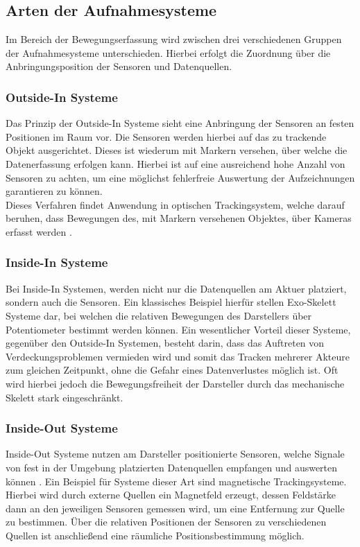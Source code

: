 \subsection{Arten der Aufnahmesysteme}
Im Bereich der Bewegungserfassung wird zwischen drei verschiedenen Gruppen der Aufnahmesysteme unterschieden. Hierbei erfolgt die Zuordnung über die Anbringungsposition der Sensoren und Datenquellen. \cite{P25}
\subsubsection{Outside-In Systeme}
Das Prinzip der Outside-In Systeme sieht eine Anbringung der Sensoren an festen Positionen im Raum vor. Die Sensoren werden hierbei auf das zu trackende Objekt ausgerichtet. Dieses ist wiederum mit Markern versehen, über welche die Datenerfassung erfolgen kann.
Hierbei ist auf eine ausreichend hohe Anzahl von Sensoren zu achten, um eine möglichst fehlerfreie Auswertung der Aufzeichnungen garantieren zu können. \cite{P25}
\\Dieses Verfahren findet Anwendung in optischen Trackingsystem, welche darauf beruhen, dass Bewegungen des, mit Markern versehenen Objektes, über Kameras erfasst werden \cite{optsys2}.
\subsubsection{Inside-In Systeme}
Bei Inside-In Systemen, werden nicht nur die Datenquellen am Aktuer platziert, sondern auch die Sensoren.
Ein klassisches Beispiel hierfür stellen Exo-Skelett Systeme dar, bei welchen die relativen Bewegungen des Darstellers über Potentiometer bestimmt werden können.
Ein wesentlicher Vorteil dieser Systeme, gegenüber den Outside-In Systemen, besteht darin, dass das Auftreten von Verdeckungsproblemen vermieden wird und somit das Tracken mehrerer Akteure zum gleichen Zeitpunkt, ohne die Gefahr eines Datenverlustes möglich ist.
Oft wird hierbei jedoch die Bewegungsfreiheit der Darsteller durch das mechanische Skelett stark eingeschränkt. \cite{optsys2}
\subsubsection{Inside-Out Systeme}
Inside-Out Systeme nutzen am Darsteller positionierte Sensoren, welche Signale von fest in der Umgebung platzierten Datenquellen empfangen und auswerten können \cite{P25}.
Ein Beispiel für Systeme dieser Art sind magnetische Trackingsysteme. Hierbei wird durch externe Quellen ein Magnetfeld erzeugt, dessen Feldstärke dann an den jeweiligen Sensoren gemessen wird, um eine Entfernung zur Quelle zu bestimmen. Über die relativen Positionen der Sensoren zu verschiedenen Quellen ist anschließend eine räumliche Positionsbestimmung möglich. \cite{optsys2}

